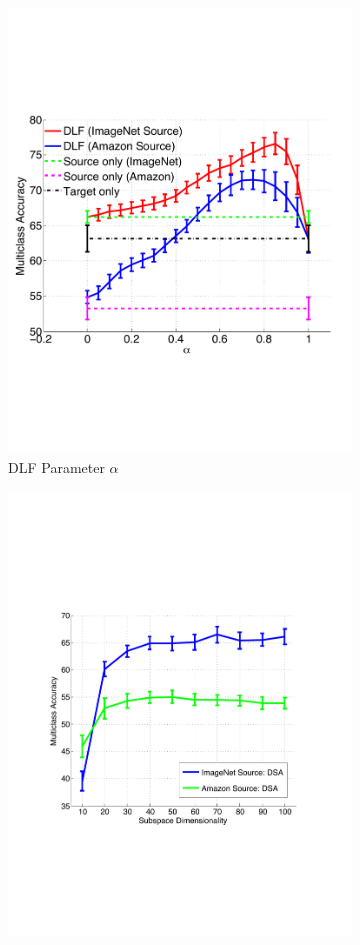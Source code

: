 \begin{figure}
\centering
\hspace{-4em}
\begin{subfigure}[b]{0.26\textwidth}
\centering
\includegraphics[height=\textwidth]{figs/amazonAndImagenet-linint-vs-alpha_C1_fc8.pdf}
\caption{DLF Parameter $\alpha$}
\label{fig:linint-eval}
\end{subfigure}
%
\hspace{3em}
\begin{subfigure}[b]{0.27\textwidth}
\centering
\includegraphics[height=\linewidth]{figs/amazonAndImagenet-sa_dim_C1_fc7.pdf}

\end{subfigure}
\end{figure}
